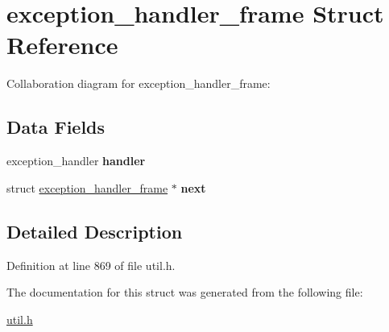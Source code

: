 \hypertarget{structexception__handler__frame}{}\section{exception\+\_\+handler\+\_\+frame Struct Reference}
\label{structexception__handler__frame}


Collaboration diagram for exception\+\_\+handler\+\_\+frame\+:
\subsection*{Data Fields}
\begin{DoxyCompactItemize}
\item 
\mbox{\label{structexception__handler__frame_a9df815cc8cec8aace242043b89fb44e8}} 
exception\+\_\+handler {\bfseries handler}
\item 
\mbox{\label{structexception__handler__frame_a407cf31d00d01b49b1774dea464c29cf}} 
struct \hyperlink{structexception__handler__frame}{exception\+\_\+handler\+\_\+frame} $\ast$ {\bfseries next}
\end{DoxyCompactItemize}


\subsection{Detailed Description}


Definition at line 869 of file util.\+h.



The documentation for this struct was generated from the following file\+:\begin{DoxyCompactItemize}
\item 
\hyperlink{util_8h}{util.\+h}\end{DoxyCompactItemize}

